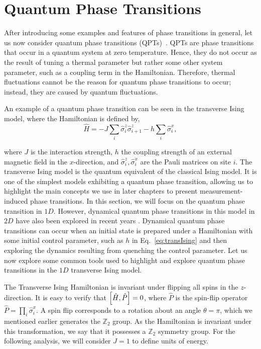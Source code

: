 \section{Quantum Phase Transitions}

After introducing some examples and features of phase transitions in general, let us now consider quantum phase transitions (QPTs)~\cite{sachdev2011, vojta2002, vojta2003,  heyl2018}. QPTs are phase transitions that occur in a quantum system at zero temperature. Hence, they do not occur as the result of tuning a thermal parameter but rather some other system parameter, such as a coupling term in the Hamiltonian. Therefore, thermal fluctuations cannot be the reason for quantum phase transitions to occur; instead, they are caused by quantum fluctuations. 

An example of a quantum phase transition can be seen in the transverse Ising model, where the Hamiltonian is defined by,
\begin{equation}
    \label{eq:transIsing}
    \hat{H} = -J \sum\limits_i \hat{\sigma}^z_i \hat{\sigma}^z_{i+1} - h \sum_i \hat{\sigma}^x_i,
\end{equation}

where $J$ is the interaction strength, $h$ the coupling strength of an external magnetic field in the $x$-direction, and $\hat{\sigma}^z_i, \hat{\sigma}^x_i$ are the Pauli matrices on site $i$. The transverse Ising model is the quantum equivalent of the classical Ising model. It is one of the simplest models exhibiting a quantum phase transition, allowing us to highlight the main concepts we use in later chapters to present measurement-induced phase transitions. In this section, we will focus on the quantum phase transition in $1D$. However, dynamical quantum phase transitions in this model in $2D$ have also been explored in recent years \cite{halimeh2017, hashizume2022}. Dynamical quantum phase transitions can occur when an initial state is prepared under a Hamiltonian with some initial control parameter, such as $h$ in Eq.~\ref{eq:transIsing} and then exploring the dynamics resulting from quenching the control parameter. Let us now explore some common tools used to highlight and explore quantum phase transitions in the $1D$ transverse Ising model.

The Transverse Ising Hamiltonian is invariant under flipping all spins in the $z$-direction. It is easy to verify that $\comm{\hat{H}}{\hat{P}} = 0$, where $\hat{P}$  is the spin-flip operator $\hat{P}  = \prod_i \hat{\sigma}^x_i$. A spin flip corresponds to a rotation about an angle $\theta = \pi$, which we mentioned earlier generates the $\mathbb{Z}_2$ group. As the Hamiltonian is invariant under this transformation, we say that it possesses a $\mathbb{Z}_2$ symmetry group. For the following analysis, we will consider $J = 1$ to define units of energy. 

